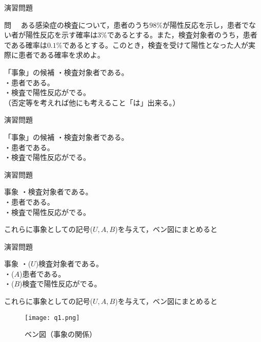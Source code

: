 \documentclass[aspectratio=169, dvipdfmx, 11pt]{beamer}
\begin{document}
\begin{frame}{演習問題}

\begin{block}{問}
　ある感染症の検査について，患者のうち$98\%$が陽性反応を示し，患者でない者が陽性反応を示す確率は$3\%$であるとする。また，検査対象者のうち，患者である確率は$0.1\%$であるとする。このとき，検査を受けて陽性となった人が実際に患者である確率を求めよ。
\end{block}

\begin{alertblock}{「事象」の候補}
・検査対象者である。\\
・患者である。\\
・検査で陽性反応がでる。\\
（否定等を考えれば他にも考えること「は」出来る。）
\end{alertblock}

\end{frame}


\begin{frame}{演習問題}

\begin{alertblock}{「事象」の候補}
・検査対象者である。\\
・患者である。\\
・検査で陽性反応がでる。\\
\end{alertblock}

\end{frame}


\begin{frame}{演習問題}

\begin{alertblock}{事象}
・検査対象者である。\\
・患者である。\\
・検査で陽性反応がでる。\\
\end{alertblock}
これらに事象としての記号($U,A,B$)を与えて，ベン図にまとめると
\end{frame}


\begin{frame}{演習問題}

\begin{alertblock}{事象}
・($U$)検査対象者である。\\
・($A$)患者である。\\
・($B$)検査で陽性反応がでる。\\
\end{alertblock}
これらに事象としての記号($U,A,B$)を与えて，ベン図にまとめると

\begin{figure}[H]
  \begin{center}
    \texttt{[image: q1.png]}
    \caption{ベン図（事象の関係）}
    \label{fig:graph5}
  \end{center}
\end{figure}

\end{frame}
\end{document}
